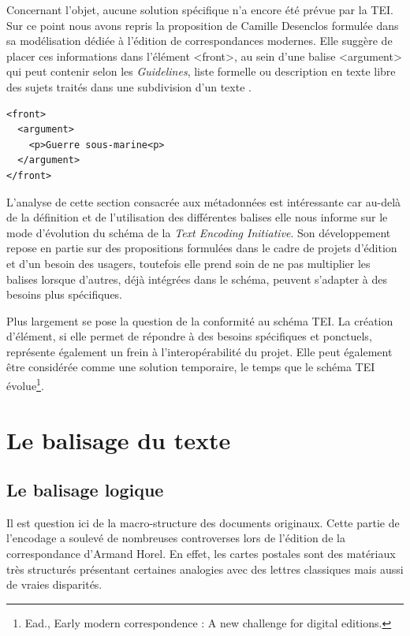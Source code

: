 \documentclass[12pt,a4paper]{book} %
\begin{document}
Concernant l'objet, aucune solution spécifique n'a encore été prévue par la TEI. Sur ce point nous avons repris la proposition de Camille Desenclos formulée dans sa modélisation dédiée à l'édition de correspondances modernes. Elle suggère de placer ces informations dans l'élément <front>, au sein d'une balise <argument> qui peut contenir selon les \textit{Guidelines}, \og [une] liste formelle ou description en texte libre des sujets traités dans une subdivision d'un texte \fg{}.
\bigskip

\begin{lstlisting}
<front>
  <argument>
    <p>Guerre sous-marine<p>
  </argument>
</front>
\end{lstlisting}
\bigskip

L'analyse de cette section consacrée aux métadonnées est intéressante car au-delà de la définition et de l'utilisation des différentes balises elle nous informe sur le mode d'évolution du schéma de la \textit{Text Encoding Initiative}. Son développement repose en partie sur des propositions formulées dans le cadre de projets d'édition et d'un besoin des usagers, toutefois elle prend soin de ne pas multiplier les balises lorsque d'autres, déjà intégrées dans le schéma, peuvent s'adapter à des besoins plus spécifiques.

Plus largement se pose la question de la conformité au schéma TEI. La création d'élément, si elle permet de répondre à des besoins spécifiques et ponctuels, représente également un frein à l'interopérabilité du projet. Elle peut également être considérée comme une solution temporaire, le temps que le schéma TEI évolue\footnote{Ead., \og Early modern correspondence : A new challenge for digital editions\fg{}. }.%

\section{Le balisage du texte}

\subsection{Le balisage logique}
Il est question ici de la macro-structure des documents originaux. Cette partie de l'encodage a soulevé de nombreuses controverses lors de l'édition de la correspondance d'Armand Horel. En effet, les cartes postales  sont des matériaux très structurés présentant certaines analogies avec des lettres classiques mais aussi de vraies disparités. 
\end{document}
